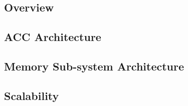 \subsection{Overview}
\label{sec:overview}


\subsection{ACC Architecture}
\label{sec:processing}


\subsection{Memory Sub-system Architecture}
\label{sec:memory}


\subsection{Scalability}
\label{sec:scale}

